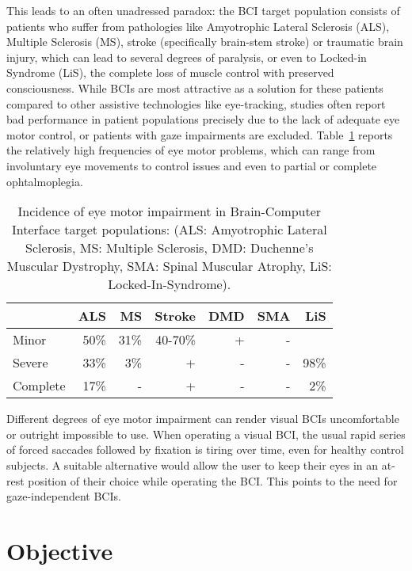 This leads to an often unadressed paradox: the BCI target population consists
of patients who suffer from pathologies like Amyotrophic Lateral Sclerosis
(ALS), Multiple Sclerosis (MS), stroke (specifically
brain-stem stroke) or traumatic brain injury, which can lead to several degrees
of paralysis, or even to Locked-in Syndrome (LiS), the complete loss of muscle
control with preserved consciousness.
While BCIs are most attractive as a solution for these patients
compared to other assistive technologies like eye-tracking, studies often
report bad performance in patient populations precisely due to the lack of adequate eye motor
control, or patients with gaze impairments are excluded.
Table~\ref{tab:incidence} reports the relatively high frequencies of
eye motor problems, which can range from involuntary eye movements to control
issues and even to partial or complete ophtalmoplegia.
\begin{table}
	\centering
	\begin{tabular}{@{}|l|rrrrr|r|@{}}
		\hline
		         & ALS  & MS   & Stroke  &
		DMD      & SMA  & LiS                           \\ \hline
		Minor    & 50\% & 31\% & 40-70\% & + & - &      \\
		Severe   & 33\% & 3\%  & +       & - & - & 98\% \\
		Complete & 17\% & -    & +       & - & - & 2\%  \\
		\hline
	\end{tabular}
	\caption{Incidence of eye motor impairment in Brain-Computer Interface target
		populations: (ALS: Amyotrophic Lateral Sclerosis, MS: Multiple Sclerosis,
		DMD: Duchenne's Muscular Dystrophy, SMA: Spinal Muscular Atrophy, LiS:
		Locked-In-Syndrome).}\label{tab:incidence}
\end{table}
Different degrees of eye motor impairment can render visual BCIs
uncomfortable or outright impossible to use.
When operating a visual BCI, the usual rapid series of forced saccades followed
by fixation is tiring over time, even for healthy control subjects.
A suitable alternative would allow the user to keep their eyes in an at-rest
position of their choice while operating the BCI.
This points to the need for gaze-independent BCIs.


\section{Objective}

